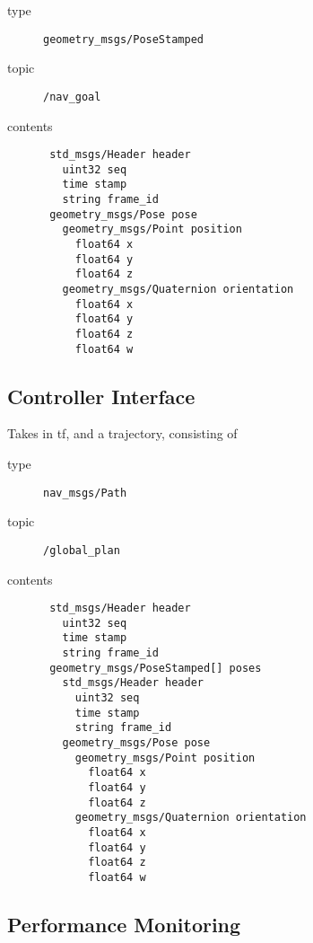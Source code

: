 \documentclass[9pt,technote]{IEEEtran} %
\begin{document}
\begin{description}
\item[type] \texttt{geometry\_msgs/PoseStamped}
\item[topic] \texttt{/nav\_goal}
\item[contents] \begin{scriptsize}
\begin{verbatim}
 std_msgs/Header header
   uint32 seq
   time stamp
   string frame_id
 geometry_msgs/Pose pose
   geometry_msgs/Point position
     float64 x
     float64 y
     float64 z
   geometry_msgs/Quaternion orientation
     float64 x
     float64 y
     float64 z
     float64 w
\end{verbatim}
\end{scriptsize}
\end{description}


\subsection{Controller Interface}

Takes in tf, and a trajectory, consisting of 

\begin{description}
\item[type] \texttt{nav\_msgs/Path}
\item[topic] \texttt{/global\_plan}
\item[contents] \begin{scriptsize}
\begin{verbatim}
 std_msgs/Header header
   uint32 seq
   time stamp
   string frame_id
 geometry_msgs/PoseStamped[] poses
   std_msgs/Header header
     uint32 seq
     time stamp
     string frame_id
   geometry_msgs/Pose pose
     geometry_msgs/Point position
       float64 x
       float64 y
       float64 z
     geometry_msgs/Quaternion orientation
       float64 x
       float64 y
       float64 z
       float64 w
\end{verbatim}
\end{scriptsize}
\end{description}

\subsection{Performance Monitoring}
\end{document}
